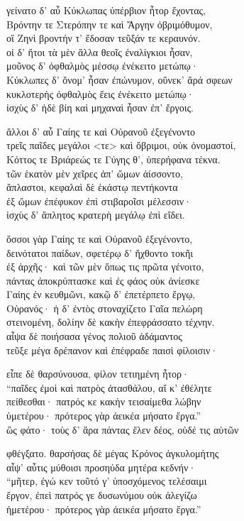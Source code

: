 \quad{}γείνατο δ' αὖ Κύκλωπας ὑπέρβιον ἦτορ ἔχοντας,\\
Βρόντην τε Στερόπην τε καὶ Ἄργην ὀβριμόθυμον, \\
οἳ Ζηνὶ βροντήν τ' ἔδοσαν τεῦξάν τε κεραυνόν.\\
οἱ δ' ἤτοι τὰ μὲν ἄλλα θεοῖς ἐναλίγκιοι ἦσαν,\\
μοῦνος δ' ὀφθαλμὸς μέσσῳ ἐνέκειτο μετώπῳ· \\
Κύκλωπες δ' ὄνομ' ἦσαν ἐπώνυμον, οὕνεκ' ἄρά σφεων\\
κυκλοτερὴς ὀφθαλμὸς ἕεις ἐνέκειτο μετώπῳ· \\
ἰσχὺς δ' ἠδὲ βίη καὶ μηχαναὶ ἦσαν ἐπ' ἔργοις.

\quad{}ἄλλοι δ' αὖ Γαίης τε καὶ Οὐρανοῦ ἐξεγένοντο\\
τρεῖς παῖδες μεγάλοι \textless{}τε\textgreater{} καὶ ὄβριμοι, οὐκ ὀνομαστοί, \\
Κόττος τε Βριάρεώς τε Γύγης θ', ὑπερήφανα τέκνα. \\
τῶν ἑκατὸν μὲν χεῖρες ἀπ' ὤμων ἀίσσοντο, \\
ἄπλαστοι, κεφαλαὶ δὲ ἑκάστῳ πεντήκοντα\\
ἐξ ὤμων ἐπέφυκον ἐπὶ στιβαροῖσι μέλεσσιν· \\
ἰσχὺς δ' ἄπλητος κρατερὴ μεγάλῳ ἐπὶ εἴδει.

\quad{}ὅσσοι γὰρ Γαίης τε καὶ Οὐρανοῦ ἐξεγένοντο,\\
δεινότατοι παίδων, σφετέρῳ δ' ἤχθοντο τοκῆι \\
ἐξ ἀρχῆς· καὶ τῶν μὲν ὅπως τις πρῶτα γένοιτο, \\
πάντας ἀποκρύπτασκε καὶ ἐς φάος οὐκ ἀνίεσκε\\
Γαίης ἐν κευθμῶνι, κακῷ δ' ἐπετέρπετο ἔργῳ, \\
Οὐρανός· ἡ δ' ἐντὸς στοναχίζετο Γαῖα πελώρη\\
στεινομένη, δολίην δὲ κακὴν ἐπεφράσσατο τέχνην. \\
αἶψα δὲ ποιήσασα γένος πολιοῦ ἀδάμαντος\\
τεῦξε μέγα δρέπανον καὶ ἐπέφραδε παισὶ φίλοισιν· 

\quad{}εἶπε δὲ θαρσύνουσα, φίλον τετιημένη ἦτορ·\\
``παῖδες ἐμοὶ καὶ πατρὸς ἀτασθάλου, αἴ κ' ἐθέλητε\\
πείθεσθαι· πατρός κε κακὴν τεισαίμεθα λώβην \\
ὑμετέρου· πρότερος γὰρ ἀεικέα μήσατο ἔργα.'' \\
ὣς φάτο· τοὺς δ' ἄρα πάντας ἕλεν δέος, οὐδέ τις αὐτῶν

\quad{}φθέγξατο. θαρσήσας δὲ μέγας Κρόνος ἀγκυλομήτης\\
αἶψ' αὖτις μύθοισι προσηύδα μητέρα κεδνήν·\\
``μῆτερ, ἐγώ κεν τοῦτό γ' ὑποσχόμενος τελέσαιμι  \\
ἔργον, ἐπεὶ πατρός γε δυσωνύμου οὐκ ἀλεγίζω\\
ἡμετέρου· πρότερος γὰρ ἀεικέα μήσατο ἔργα.''

